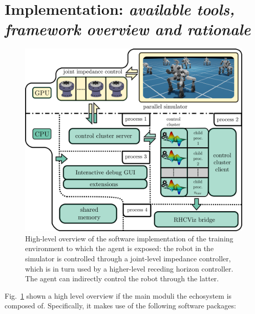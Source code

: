 \section{Implementation: \textnormal{\textit{available tools, framework overview and rationale}}}
\begin{figure}[t]
	\centering
	\includegraphics[width=0.9\columnwidth]{imgs/cocluster_arch.pdf}
	\caption{High-level overview of the software implementation of the training environment to which the agent is exposed: the robot in the simulator is controlled through a joint-level impedance controller, which is in turn used by a higher-level receding horizon controller. The agent can indirectly control the robot through the latter.}
	\label{fig:coclbridge_arch}
\end{figure}
\cite{rl:mujocoaccelereted2023}
\cite{frameworks:mittal2023orbit}
\cite{rl:rudin2022learning}
Fig.~\ref{fig:coclbridge_arch} shown a high level overview if the main moduli the echosystem is composed of. Specifically, it makes use of the following software packages:

